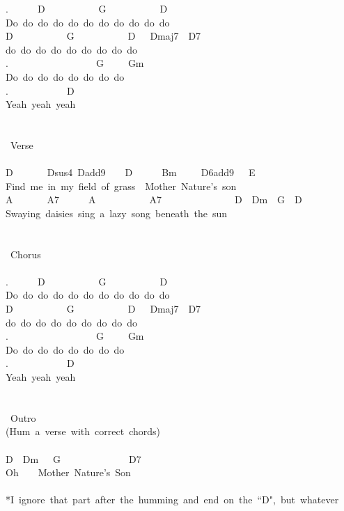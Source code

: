 {.\ \ \ \ \ \ D\ \ \ \ \ \ \ \ \ \ \ G\ \ \ \ \ \ \ \ \ \ \ D\\
Do\ do\ do\ do\ do\ do\ do\ do\ do\ do\ do\ \\
D\ \ \ \ \ \ \ \ \ \ \ G\ \ \ \ \ \ \ \ \ \ \ D\ \ \ Dmaj7\ \ D7\\
do\ do\ do\ do\ do\ do\ do\ do\ do\ \\
.\ \ \ \ \ \ \ \ \ \ \ \ \ \ \ \ \ \ G\ \ \ \ \ Gm\\
Do\ do\ do\ do\ do\ do\ do\ do\ \\
.\ \ \ \ \ \ \ \ \ \ \ \ D\\
Yeah\ yeah\ yeah\\
\\
\\
\lbrack\ Verse\rbrack\\
\\
D\ \ \ \ \ \ \ Dsus4\ Dadd9\ \ \ \ D\ \ \ \ \ \ Bm\ \ \ \ \ D6add9\ \ \ E\\
Find\ me\ in\ my\ field\ of\ grass\ \ Mother\ Nature's\ son\\
A\ \ \ \ \ \ \ A7\ \ \ \ \ \ A\ \ \ \ \ \ \ \ \ \ \ A7\ \ \ \ \ \ \ \ \ \ \ \ \ \ \ D\ \ Dm\ \ G\ \ D\\
Swaying\ daisies\ sing\ a\ lazy\ song\ beneath\ the\ sun\\
\\
\\
\lbrack\ Chorus\rbrack\\
\\
.\ \ \ \ \ \ D\ \ \ \ \ \ \ \ \ \ \ G\ \ \ \ \ \ \ \ \ \ \ D\\
Do\ do\ do\ do\ do\ do\ do\ do\ do\ do\ do\ \\
D\ \ \ \ \ \ \ \ \ \ \ G\ \ \ \ \ \ \ \ \ \ \ D\ \ \ Dmaj7\ \ D7\\
do\ do\ do\ do\ do\ do\ do\ do\ do\ \\
.\ \ \ \ \ \ \ \ \ \ \ \ \ \ \ \ \ \ G\ \ \ \ \ Gm\\
Do\ do\ do\ do\ do\ do\ do\ do\ \\
.\ \ \ \ \ \ \ \ \ \ \ \ D\\
Yeah\ yeah\ yeah\\
\\
\\
\lbrack\ Outro\rbrack\\
(Hum\ a\ verse\ with\ correct\ chords)\\
\\
D\ \ Dm\ \ \ G\ \ \ \ \ \ \ \ \ \ \ \ \ \ D7\\
Oh\ \ \ \ Mother\ Nature's\ Son\\
\\
*I\ ignore\ that\ part\ after\ the\ humming\ and\ end\ on\ the\ ``D",\ but\ whatever}

